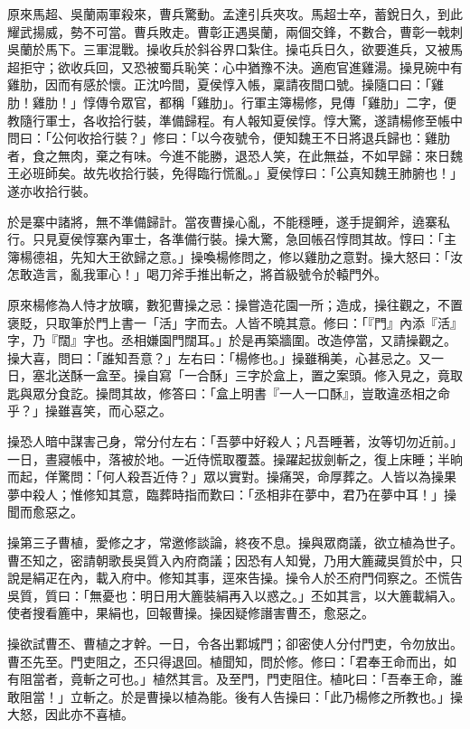 原來馬超、吳蘭兩軍殺來，曹兵驚動。孟達引兵夾攻。馬超士卒，蓄銳日久，到此耀武揚威，勢不可當。曹兵敗走。曹彰正遇吳蘭，兩個交鋒，不數合，曹彰一戟刺吳蘭於馬下。三軍混戰。操收兵於斜谷界口紮住。操屯兵日久，欲要進兵，又被馬超拒守；欲收兵回，又恐被蜀兵恥笑：心中猶豫不決。適庖官進雞湯。操見碗中有雞肋，因而有感於懷。正沈吟間，夏侯惇入帳，稟請夜間口號。操隨口曰：「雞肋！雞肋！」惇傳令眾官，都稱「雞肋」。行軍主簿楊修，見傳「雞肋」二字，便教隨行軍士，各收拾行裝，準備歸程。有人報知夏侯惇。惇大驚，遂請楊修至帳中問曰：「公何收拾行裝？」修曰：「以今夜號令，便知魏王不日將退兵歸也：雞肋者，食之無肉，棄之有味。今進不能勝，退恐人笑，在此無益，不如早歸：來日魏王必班師矣。故先收拾行裝，免得臨行慌亂。」夏侯惇曰：「公真知魏王肺腑也！」遂亦收拾行裝。

於是寨中諸將，無不準備歸計。當夜曹操心亂，不能穩睡，遂手提鋼斧，遶寨私行。只見夏侯惇寨內軍士，各準備行裝。操大驚，急回帳召惇問其故。惇曰：「主簿楊德祖，先知大王欲歸之意。」操喚楊修問之，修以雞肋之意對。操大怒曰：「汝怎敢造言，亂我軍心！」喝刀斧手推出斬之，將首級號令於轅門外。

原來楊修為人恃才放曠，數犯曹操之忌：操嘗造花園一所；造成，操往觀之，不置褒貶，只取筆於門上書一「活」字而去。人皆不曉其意。修曰：「『門』內添『活』字，乃『闊』字也。丞相嫌園門闊耳。」於是再築牆圍。改造停當，又請操觀之。操大喜，問曰：「誰知吾意？」左右曰：「楊修也。」操雖稱美，心甚忌之。又一日，塞北送酥一盒至。操自寫「一合酥」三字於盒上，置之案頭。修入見之，竟取匙與眾分食訖。操問其故，修答曰：「盒上明書『一人一口酥』，豈敢違丞相之命乎？」操雖喜笑，而心惡之。

操恐人暗中謀害己身，常分付左右：「吾夢中好殺人；凡吾睡著，汝等切勿近前。」一日，晝寢帳中，落被於地。一近侍慌取覆蓋。操躍起拔劍斬之，復上床睡；半晌而起，佯驚問：「何人殺吾近侍？」眾以實對。操痛哭，命厚葬之。人皆以為操果夢中殺人；惟修知其意，臨葬時指而歎曰：「丞相非在夢中，君乃在夢中耳！」操聞而愈惡之。

操第三子曹植，愛修之才，常邀修談論，終夜不息。操與眾商議，欲立植為世子。曹丕知之，密請朝歌長吳質入內府商議；因恐有人知覺，乃用大簏藏吳質於中，只說是絹疋在內，載入府中。修知其事，逕來告操。操令人於丕府門伺察之。丕慌告吳質，質曰：「無憂也：明日用大簏裝絹再入以惑之。」丕如其言，以大簏載絹入。使者搜看簏中，果絹也，回報曹操。操因疑修譖害曹丕，愈惡之。

操欲試曹丕、曹植之才幹。一日，令各出鄴城門；卻密使人分付門吏，令勿放出。曹丕先至。門吏阻之，丕只得退回。植聞知，問於修。修曰：「君奉王命而出，如有阻當者，竟斬之可也。」植然其言。及至門，門吏阻住。植叱曰：「吾奉王命，誰敢阻當！」立斬之。於是曹操以植為能。後有人告操曰：「此乃楊修之所教也。」操大怒，因此亦不喜植。

